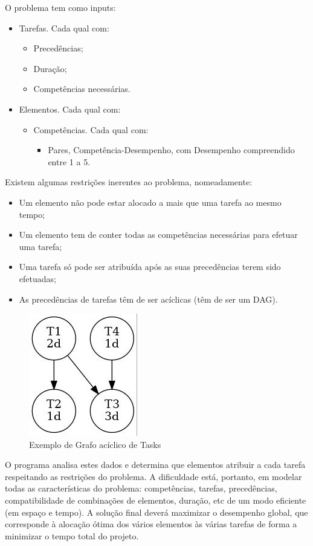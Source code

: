 \documentclass[a4paper,11pt]{article}
\begin{document}
O problema tem como inputs:
\begin{itemize}
	\item Tarefas. Cada qual com:
	\begin{itemize}
		\item Precedências;
		\item Duração;
		\item Competências necessárias.
	\end{itemize}
	\item Elementos. Cada qual com:
	\begin{itemize}
		\item Competências. Cada qual com:
			\begin{itemize}
				\item Pares, Competência-Desempenho, com Desempenho compreendido entre 1 a 5.
			\end{itemize} 
	\end{itemize}	
\end{itemize}

Existem algumas restrições inerentes ao problema, nomeadamente:
\begin{itemize}
	\item Um elemento não pode estar alocado a mais que uma tarefa ao mesmo tempo;
	\item Um elemento tem de conter todas as competências necessárias para efetuar uma tarefa;
	\item Uma tarefa só pode ser atribuída após as suas precedências terem sido efetuadas;
	\item As precedências de tarefas têm de ser acíclicas (têm de ser um DAG).
\end{itemize}

\begin{figure}[H]
	\centering
	\includegraphics[scale=0.4]{tasks_graph.jpeg}
	\caption{Exemplo de Grafo acíclico de Tasks}
	\label{fig:tasks_graph}
\end{figure}

O programa analisa estes dados e determina que elementos atribuir a cada tarefa respeitando as restrições do problema. A dificuldade está, portanto, em modelar todas as características do problema: competências, tarefas, precedências, compatibilidade de combinações de elementos, duração, etc de um modo eficiente (em espaço e tempo). A solução final deverá maximizar o desempenho global, que corresponde à alocação ótima dos vários elementos às várias tarefas de forma a minimizar o tempo total do projeto.
\end{document}
